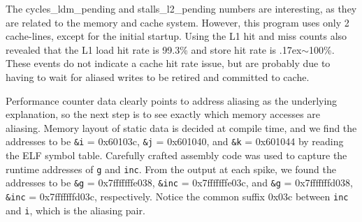 \documentclass[10pt, conference, compsocconf]{IEEEtran}
\begin{document}
The cycles\_ldm\_pending and stalls\_l2\_pending numbers are interesting, as they are related to the memory and cache system.
However, this program uses only 2 cache-lines, except for the initial startup.
Using the L1 hit and miss counts also revealed that the L1 load hit rate is 99.3\% and store hit rate is {\raise.17ex\hbox{$\scriptstyle\mathtt{\sim}$}}100\%.
These events do not indicate a cache hit rate issue, but are probably due to having to wait for aliased writes to be retired and committed to cache.

Performance counter data clearly points to address aliasing as the underlying explanation, so the next step is to see exactly which memory accesses are aliasing.
Memory layout of static data is decided at compile time, and we find the addresses to be \texttt{\&i} = 0x60103c, \texttt{\&j} = 0x601040, and \texttt{\&k} = 0x601044 by reading the ELF symbol table.
Carefully crafted assembly code was used to capture the runtime addresses of \texttt{g} and \texttt{inc}.
From the output at each spike, we found the addresses to be \texttt{\&g} = 0x7fffffffe038, \texttt{\&inc} = 0x7fffffffe03c, and \texttt{\&g} = 0x7fffffffd038, \texttt{\&inc} = 0x7fffffffd03c, respectively.
Notice the common suffix 0x03c between \texttt{inc} and \texttt{i}, which is the aliasing pair.


% 
 
\end{document}
